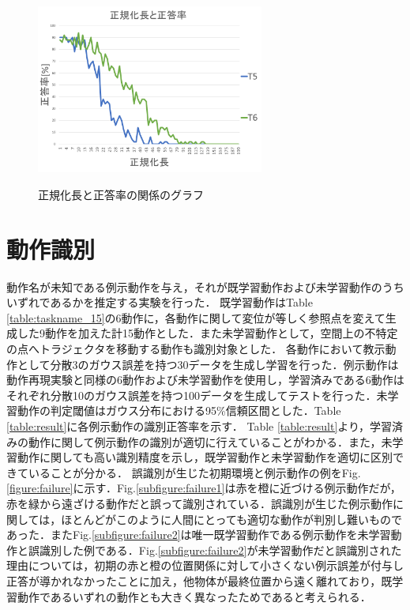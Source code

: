 \begin{figure}[h]
\begin{minipage}[t]{.49\textwidth}
		\label{subfigure:unit_c}
	\end{minipage}
	\begin{minipage}[t]{.49\textwidth}
		\centering
		\includegraphics[width=7.5cm]{chart11_d.png} \\ %
		\label{subfigure:unit_d}
	\end{minipage}
	\caption{正規化長と正答率の関係のグラフ}
	\label{figure:success_rate_for_UNIT}
\end{figure}


\section{動作識別}

動作名が未知である例示動作を与え，それが既学習動作および未学習動作のうちいずれであるかを推定する実験を行った．
既学習動作はTable \ref{table:taskname_15}の6動作に，各動作に関して変位が等しく参照点を変えて生成した9動作を加えた計15動作とした．また未学習動作として，空間上の不特定の点へトラジェクタを移動する動作も識別対象とした．
各動作において教示動作として分散3のガウス誤差を持つ30データを生成し学習を行った．例示動作は動作再現実験と同様の6動作および未学習動作を使用し，学習済みである6動作はそれぞれ分散10のガウス誤差を持つ100データを生成してテストを行った．未学習動作の判定閾値はガウス分布における95\%信頼区間とした．Table \ref{table:result}に各例示動作の識別正答率を示す．
Table \ref{table:result}より，学習済みの動作に関して例示動作の識別が適切に行えていることがわかる．また，未学習動作に関しても高い識別精度を示し，既学習動作と未学習動作を適切に区別できていることが分かる．
誤識別が生じた初期環境と例示動作の例をFig.\ref{figure:failure}に示す．Fig.\ref{subfigure:failure1}は赤を橙に近づける例示動作だが，赤を緑から遠ざける動作だと誤って識別されている．誤識別が生じた例示動作に関しては，ほとんどがこのように人間にとっても適切な動作が判別し難いものであった．またFig.\ref{subfigure:failure2}は唯一既学習動作である例示動作を未学習動作と誤識別した例である．Fig.\ref{subfigure:failure2}が未学習動作だと誤識別された理由については，初期の赤と橙の位置関係に対して小さくない例示誤差が付与し正答が導かれなかったことに加え，他物体が最終位置から遠く離れており，既学習動作であるいずれの動作とも大きく異なったためであると考えられる．

